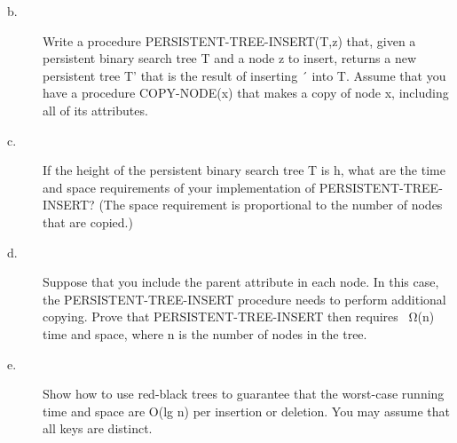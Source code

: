 \documentclass[12pt]{article}
\begin{document}
    \begin{description}
   
            \item[b.] Write a procedure PERSISTENT-TREE-INSERT(T,z) that, given a persistent binary search tree T and a node z to insert, returns a new persistent tree T' that is the result of inserting ´ into T. Assume that you have a procedure COPY-NODE(x) that makes a copy of node x, including all of its attributes.\\
            \item[c.]If the height of the persistent binary search tree T is h, what are the time and space requirements of your implementation of PERSISTENT-TREE-INSERT? (The space requirement is proportional to the number of nodes that are copied.)\\
            \item[d.] Suppose that you include the parent attribute in each node. In this case, the PERSISTENT-TREE-INSERT procedure needs to perform additional copying. Prove that PERSISTENT-TREE-INSERT then requires \SI{}{\ohm}(n) time and space, where n is the number of nodes in the tree.\\
            \item[e.]Show how to use red-black trees to guarantee that the worst-case running time and space are O(lg n) per insertion or deletion. You may assume that all keys are distinct.
        \end{description}
\end{document}
